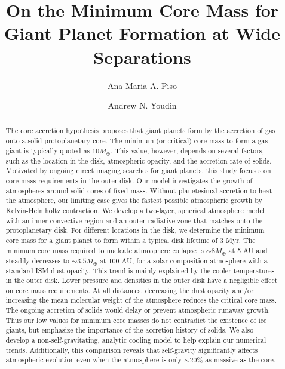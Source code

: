 \documentclass[apj, numberedappendix]{emulateapj}
\begin{document}



\title{On the Minimum Core Mass for Giant Planet Formation at Wide Separations}

\author{Ana-Maria A. Piso}

\author{Andrew N. Youdin}


\begin{abstract}

The core accretion hypothesis proposes that giant planets form by the accretion of gas onto a solid protoplanetary core. The minimum (or critical) core mass to form a gas giant is typically quoted as $10 M_{\oplus}$. This value, however, depends on several factors, such as the location in the disk, atmospheric opacity, and the accretion rate of solids.  Motivated by ongoing direct imaging searches for giant planets, this study focuses on core mass requirements in the outer disk.
Our model investigates the growth of atmospheres around solid cores of fixed mass.  Without planetesimal accretion to heat the atmosphere, our limiting case gives the fastest possible atmospheric growth by Kelvin-Helmholtz contraction. We develop a two-layer, spherical atmosphere model with an inner convective region and an outer radiative zone that matches onto the protoplanetary disk.  For different locations in the disk, we determine the minimum core mass for a giant planet to form within a typical disk lifetime of 3 Myr.   The minimum core mass required to nucleate atmosphere collapse is $\sim 8 M_{\oplus}$ at 5 AU and steadily decreases to $\sim 3.5 M_{\oplus}$ at 100 AU, for a solar composition atmosphere with a standard ISM dust opacity.   This trend is mainly explained by the cooler temperatures in the outer disk. Lower pressure and densities in the outer disk have a negligible effect on core mass requirements.  At all distances, decreasing the dust opacity and/or increasing the mean molecular weight of the atmosphere reduces the critical core mass.   The ongoing accretion of solids would delay or prevent atmospheric runaway growth.  Thus our low values for minimum core masses do not contradict the existence of ice giants, but emphasize the importance of the accretion history of solids.  We also develop a non-self-gravitating, analytic cooling model to help explain our numerical trends.  Additionally, this comparison reveals that self-gravity significantly affects atmospheric evolution even when the atmosphere is only $\sim 20\%$ as massive as the core.

\end{abstract}
\end{document}
